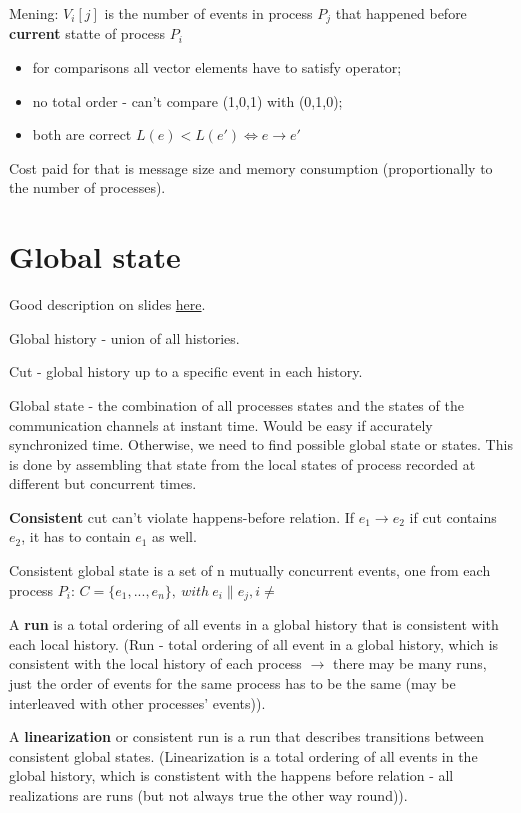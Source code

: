 \documentclass[10pt,a4paper]{article}
\begin{document}
Mening: $V_i[j]$ is the number of events in process $P_j$ that happened before \textbf{current} statte of process $P_i$

\begin{itemize}
	\item for comparisons all vector elements have to satisfy operator;
	\item no total order - can't compare (1,0,1) with (0,1,0);
	\item both are correct $L(e) < L(e') \Leftrightarrow e \rightarrow e'$
\end{itemize}
Cost paid for that is message size and memory consumption (proportionally to the number of processes). 

\section{Global state}

Good description on slides \href{https://www.kth.se/social/upload/504cfa18f27654461c000002/global%20state.pdf}{here}.


Global history - union of all histories. 

Cut - global history up to a specific event in each history. 

Global state - the combination of all processes states and the states of the communication channels at instant time. Would be easy if accurately synchronized time. Otherwise, we need to find possible global state or states. This is done by assembling that state from the local states of process recorded at different but concurrent times. 

\textbf{Consistent} cut can't violate happens-before relation. If $e_1 \rightarrow e_2$ if cut contains $e_2$, it has to contain $e_1$ as well. 

Consistent global state is a set of n mutually concurrent events, one from each process $P_i$: $C = \{e_1,...,e_n\}, \ with \ e_i \|e_j, i \neq~$

A \textbf{run} is a total ordering of all events in a global history that is consistent with each local history. (Run - total ordering of all event in a global history, which is consistent with the local history of each process $\rightarrow$ there may be many runs, just the order of events for the same process has to be the same (may be interleaved with other processes' events)).

A \textbf{linearization} or consistent run is a run that describes transitions between consistent global states. (Linearization is a total ordering of all events in the global history, which is constistent with the happens before relation - all realizations are runs (but not always true the other way round)).
\end{document}
